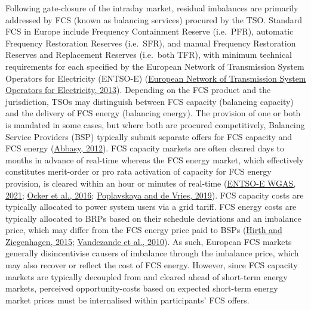 \documentclass[12pt,a4paper,]{report}
\begin{document}
Following gate-closure of the intraday market, residual imbalances are
primarily addressed by FCS (known as balancing services) procured by the
TSO. Standard FCS in Europe include Frequency Containment Reserve
(i.e.~PFR), automatic Frequency Restoration Reserves (i.e.~SFR), and
manual Frequency Restoration Reserves and Replacement Reserves
(i.e.~both TFR), with minimum technical requirements for each specified
by the European Network of Transmission System Operators for Electricity
(ENTSO-E)
(\protect\hyperlink{ref-europeannetworkoftransmissionsystemoperatorsforelectricityentso-eNetworkCodeLoadFrequency2013}{European
Network of Transmission System Operators for Electricity, 2013}).
Depending on the FCS product and the jurisdiction, TSOs may distinguish
between FCS capacity (balancing capacity) and the delivery of FCS energy
(balancing energy). The provision of one or both is mandated in some
cases, but where both are procured competitively, Balancing Service
Providers (BSP) typically submit separate offers for FCS capacity and
FCS energy
(\protect\hyperlink{ref-abbasyNationalDesignMultinational2012}{Abbasy,
2012}). FCS capacity markets are often cleared days to months in advance
of real-time whereas the FCS energy market, which effectively
constitutes merit-order or pro rata activation of capacity for FCS
energy provision, is cleared within an hour or minutes of real-time
(\protect\hyperlink{ref-entso-ewgasSurveyAncillaryServices2021}{ENTSO-E
WGAS, 2021};
\protect\hyperlink{ref-ockerDesignEuropeanBalancing2016}{Ocker et al.,
2016};
\protect\hyperlink{ref-poplavskayaDistributedEnergyResources2019}{Poplavskaya
and de Vries, 2019}). FCS capacity costs are typically allocated to
power system users via a grid tariff. FCS energy costs are typically
allocated to BRPs based on their schedule deviations and an imbalance
price, which may differ from the FCS energy price paid to BSPs
(\protect\hyperlink{ref-hirthBalancingPowerVariable2015}{Hirth and
Ziegenhagen, 2015};
\protect\hyperlink{ref-vandezandeWellfunctioningBalancingMarkets2010}{Vandezande
et al., 2010}). As such, European FCS markets generally disincentivise
causers of imbalance through the imbalance price, which may also recover
or reflect the cost of FCS energy. However, since FCS capacity markets
are typically decoupled from and cleared ahead of short-term energy
markets, perceived opportunity-costs based on expected short-term energy
market prices must be internalised within participants' FCS offers.
\end{document}
